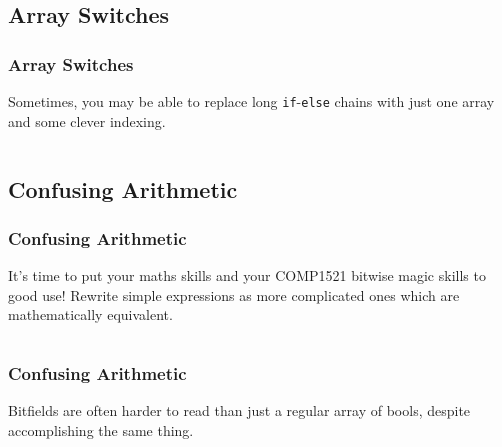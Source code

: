 \documentclass[xcolor]{beamer}
\begin{document}
\subsection{Array Switches}

\begin{frame}
	\frametitle{Array Switches}
	\pause
	
	Sometimes, you may be able to replace long \texttt{if}-\texttt{else} chains with just one array and some clever indexing.
	\pause
	
	\begin{columns}
		\begin{column}{0.45\textwidth}
			\centering
			
		\end{column}
		\pause
		
		\begin{column}{0.45\textwidth}
			\centering
			
		\end{column}
	\end{columns}
\end{frame}

\subsection{Confusing Arithmetic}

\begin{frame}
	\frametitle{Confusing Arithmetic}
	\pause
	
	It's time to put your maths skills and your COMP1521 bitwise magic skills to good use! \pause Rewrite simple expressions as more complicated ones which are mathematically equivalent.
	\pause
	
	\begin{columns}
		\begin{column}{0.45\textwidth}
			\centering
			
		\end{column}
		\pause
		\begin{column}{0.45\textwidth}
			\centering
			
		\end{column}
	\end{columns}
\end{frame}

\begin{frame}
	\frametitle{Confusing Arithmetic}
	\pause
	
	Bitfields are often harder to read than just a regular array of bools, despite accomplishing the same thing.
	\pause
	
	\begin{columns}
		\begin{column}{0.45\textwidth}
			\centering
			
		\end{column}
		\pause
		
		\begin{column}{0.45\textwidth}
			\centering
			
		\end{column}
	\end{columns}
\end{frame}
\end{document}
